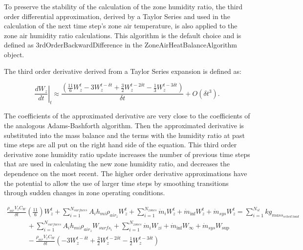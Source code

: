 To preserve the stability of the calculation of the zone humidity ratio, the third order differential approximation, derived by a Taylor Series and used in the calculation of the next time step's zone air temperature, is also applied to the zone air humidity ratio calculations. This algorithm is the default choice and is defined as 3rdOrderBackwardDifference in the ZoneAirHeatBalanceAlgorithm object.

The third order derivative derived from a Taylor Series expansion is defined as:

\begin{equation}
{\left. {\frac{{d{W_z}}}{{dt}}} \right|_t} \approx \frac{{\left( {{\textstyle{\frac{11}{6}}}W_z^t - 3W_z^{t - \delta t} + {\textstyle{\frac{3}{2}}}W_z^{t - 2\delta t} - {\textstyle{\frac{1}{3}}}W_z^{t - 3\delta t}} \right)}}{{\delta t}} + O\left( {\delta {t^3}} \right) .
\end{equation}

The coefficients of the approximated derivative are very close to the coefficients of the analogous Adams-Bashforth algorithm. Then the approximated derivative is substituted into the mass balance and the terms with the humidity ratio at past time steps are all put on the right hand side of the equation. This third order derivative zone humidity ratio update increases the number of previous time steps that are used in calculating the new zone humidity ratio, and decreases the dependence on the most recent. The higher order derivative approximations have the potential to allow the use of larger time steps by smoothing transitions through sudden changes in zone operating conditions.

\begin{equation}
\begin{array}{l}\frac{{{\rho_{air}}{V_z}{C_W}}}{{\delta t}}\left( {\frac{{11}}{6}} \right)W_z^t + \sum\limits_{i = 1}^{{N_{surfaces}}} {{A_i}{h_{mi}}} {\rho_{ai{r_z}}}W_z^t + \sum\limits_{i = 1}^{{N_{zones}}} {{{\dot m}_i}} W_z^t + {{\dot m}_{\inf }}W_z^t + {{\dot m}_{sys}}W_z^t = \sum\limits_{i = 1}^{{N_{sl}}} {k{g_{mas{s_{sched\;load}}}}} \\
\quad \quad \quad + \sum\limits_{i = 1}^{{N_{surfaces}}} {{A_i}{h_{mi}}} {\rho_{ai{r_z}}}{W_{surf{s_i}}} + \sum\limits_{i = 1}^{{N_{zones}}} {{{\dot m}_i}} {W_{zi}} + {{\dot m}_{\inf }}{W_\infty } + {{\dot m}_{sys}}{W_{\sup }} \\
\quad \quad \quad - \frac{{{\rho_{air}}{V_z}{C_W}}}{{\delta t}}\left( { - 3W_z^{t - \delta t} + \frac{3}{2}W_z^{t - 2\delta t} - \frac{1}{2}W_z^{t - 3\delta t}} \right)\end{array}
\end{equation}

